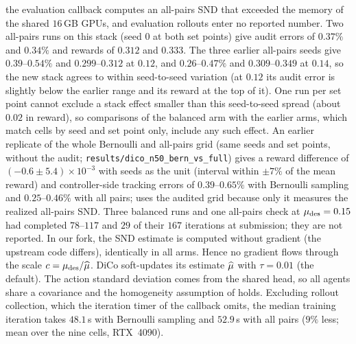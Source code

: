the evaluation callback computes an all-pairs SND that exceeded the memory of
the shared $16$\,GB GPUs, and evaluation rollouts enter no reported number. Two
all-pairs runs on this stack (seed $0$ at both set points) give audit errors of
$0.37\%$ and $0.34\%$ and rewards of $0.312$ and $0.333$. The three earlier all-pairs
seeds give $0.39$--$0.54\%$ and $0.299$--$0.312$ at $0.12$, and $0.26$--$0.47\%$ and
$0.309$--$0.349$ at $0.14$, so the new stack agrees to within seed-to-seed
variation (at $0.12$ its audit error is slightly below the earlier range and its
reward at the top of it). One run per set point cannot exclude a stack effect smaller
than this seed-to-seed spread (about $0.02$ in reward), so comparisons of the balanced
arm with the earlier arms, which match cells by seed and set point only, include any such
effect. An earlier replicate of the whole Bernoulli and all-pairs grid (same seeds and
set points, without the audit; \texttt{results/dico\_n50\_bern\_vs\_full}) gives a reward
difference of $(-0.6\pm5.4)\times10^{-3}$ with seeds as the unit (interval within $\pm7\%$
of the mean reward) and controller-side tracking errors of $0.39$--$0.65\%$ with
Bernoulli sampling and $0.25$--$0.46\%$ with all pairs;  uses the audited
grid because only it measures the realized all-pairs SND. Three balanced runs and one all-pairs check at
$\mu_{\mathrm{des}}=0.15$ had completed $78$--$117$ and $29$ of their $167$
iterations at submission; they are not reported. In our fork, the SND estimate is computed
without gradient (the upstream code differs), identically in all arms. Hence no
gradient flows through the scale ${c=\mu_{\mathrm{des}}/\widehat{\mu}}$. DiCo soft-updates its
estimate $\widehat{\mu}$ with $\tau=0.01$ (the default). The action standard deviation
comes from the shared head, so all agents share a covariance and the homogeneity
assumption of  holds. Excluding rollout collection, which the iteration timer of the
callback omits, the median training iteration takes $48.1$\,s with Bernoulli sampling and
$52.9$\,s with all pairs ($9\%$ less; mean over the nine cells, RTX~4090).

